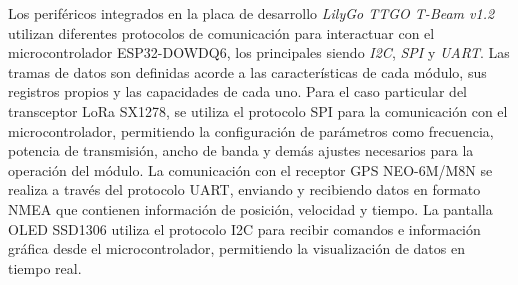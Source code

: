 \documentclass[journal]{IEEEtran}
\begin{document}
Los periféricos integrados en la placa de desarrollo \textit{LilyGo TTGO T-Beam v1.2} utilizan diferentes protocolos de comunicación para interactuar con el microcontrolador ESP32-DOWDQ6, los principales siendo \textit{I2C}, \textit{SPI} y \textit{UART}. Las tramas de datos son definidas acorde a las características de cada módulo, sus registros propios y las capacidades de cada uno. Para el caso particular del transceptor LoRa SX1278, se utiliza el protocolo SPI para la comunicación con el microcontrolador, permitiendo la configuración de parámetros como frecuencia, potencia de transmisión, ancho de banda y demás ajustes necesarios para la operación del módulo. La comunicación con el receptor GPS NEO-6M/M8N se realiza a través del protocolo UART, enviando y recibiendo datos en formato NMEA que contienen información de posición, velocidad y tiempo. La pantalla OLED SSD1306 utiliza el protocolo I2C para recibir comandos e información gráfica desde el microcontrolador, permitiendo la visualización de datos en tiempo real.
\end{document}
